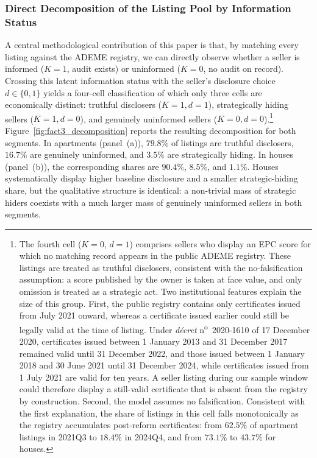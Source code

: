 \subsubsection{Direct Decomposition of the Listing Pool by Information Status}
\label{ss:fact3}

A central methodological contribution of this paper is that, by matching every listing against the ADEME registry, we can directly observe whether a seller is informed ($K=1$, audit exists) or uninformed ($K=0$, no audit on record). Crossing this latent information status with the seller's disclosure choice $d \in \{0,1\}$ yields a four-cell classification of which only three cells are economically distinct: truthful disclosers ($K=1, d=1$), strategically hiding sellers ($K=1, d=0$), and genuinely uninformed sellers ($K=0, d=0$).\footnote{The fourth cell ($K=0$, $d=1$) comprises sellers who display an EPC score for which no matching record appears in the public ADEME registry. These listings are treated as truthful disclosers, consistent with the no-falsification assumption: a score published by the owner is taken at face value, and only omission is treated as a strategic act. Two institutional features explain the size of this group. First, the public registry contains only certificates issued from July 2021 onward, whereas a certificate issued earlier could still be legally valid at the time of listing. Under \emph{d\'ecret} n\textsuperscript{o}~2020-1610 of 17 December 2020, certificates issued between 1 January 2013 and 31 December 2017 remained valid until 31 December 2022, and those issued between 1 January 2018 and 30 June 2021 until 31 December 2024, while certificates issued from 1 July 2021 are valid for ten years. A seller listing during our sample window could therefore display a still-valid certificate that is absent from the registry by construction. Second, the model assumes no falsification. Consistent with the first explanation, the share of listings in this cell falls monotonically as the registry accumulates post-reform certificates: from $62.5\%$ of apartment listings in 2021Q3 to $18.4\%$ in 2024Q4, and from $73.1\%$ to $43.7\%$ for houses.} Figure~\ref{fig:fact3_decomposition} reports the resulting decomposition for both segments. In apartments (panel~(a)), $79.8\%$ of listings are truthful disclosers, $16.7\%$ are genuinely uninformed, and $3.5\%$ are strategically hiding. In houses (panel~(b)), the corresponding shares are $90.4\%$, $8.5\%$, and $1.1\%$. Houses systematically display higher baseline disclosure and a smaller strategic-hiding share, but the qualitative structure is identical: a non-trivial mass of strategic hiders coexists with a much larger mass of genuinely uninformed sellers in both segments.

